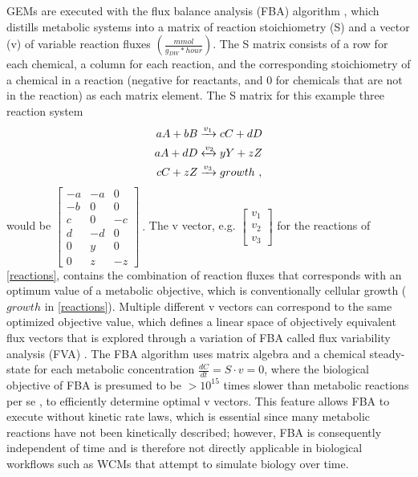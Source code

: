 GEMs are executed with the flux balance analysis (FBA) algorithm \cite{Orth2010, Lee2006FluxMetabolomics}, which distills metabolic systems into a matrix of reaction stoichiometry (S) and a vector (v) of variable reaction fluxes $\left( \frac{mmol}{g_{DW}*hour} \right)$. The S matrix consists of a row for each chemical, a column for each reaction, and the corresponding stoichiometry of a chemical in a reaction (negative for reactants, and $0$ for chemicals that are not in the reaction) as each matrix element. The S matrix for this example three reaction system
\begin{equation} \label{reactions}
    \begin{split}
        aA + bB &\xrightarrow{v_1} cC + dD \\
        aA + dD &\xleftrightarrow{v_2} yY + zZ \\ 
        cC + zZ &\xrightarrow{v_3} growth~,
    \end{split}
\end{equation}
would be $ 
    \begin{bmatrix} 
    -a & -a & 0 \\
    -b & 0 & 0 \\
    c & 0 & -c \\
    d & -d & 0 \\
    0 & y & 0 \\
    0 & z & -z 
    \end{bmatrix}~.
$
The v vector, e.g. $\begin{bmatrix} v_1 \\ v_2 \\ v_3\end{bmatrix}$ for the reactions of \cref{reactions}, contains the combination of reaction fluxes that corresponds with an optimum value of a metabolic objective, which is conventionally cellular growth ($growth$ in \cref{reactions}). Multiple different v vectors can correspond to the same optimized objective value, which defines a linear space of objectively equivalent flux vectors \cite{Nagrath2010SoftAnalysis} that is explored through a variation of FBA called flux variability analysis (FVA)  \cite{Gianchandani2010TheBiology, Gudmundsson2010ComputationallyAnalysis}. The FBA algorithm uses matrix algebra and a chemical steady-state for each metabolic concentration $\frac{dC}{dt}=S \cdot v=0$, where the biological objective of FBA is presumed to be $>10^{15}$ times slower than metabolic reactions per se \cite{Dantus1987Real-timeReactions}, to efficiently determine optimal v vectors. This feature allows FBA to execute without kinetic rate laws, which is essential since many metabolic reactions have not been kinetically described; however, FBA is consequently independent of time and is therefore not directly applicable in biological workflows such as WCMs that attempt to simulate biology over time. 

